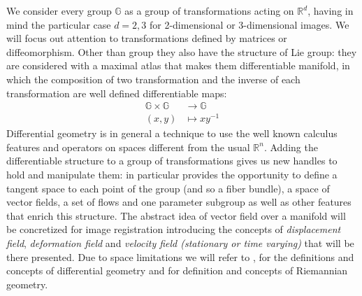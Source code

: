 We consider every group $\mathbb{G}$ as a group of transformations acting on $\mathbb{R}^{d}$, having in mind the particular case $d=2,3$ for 2-dimensional or 3-dimensional images.
We will focus out attention to transformations defined by matrices or diffeomorphism. Other than group they also have the structure of Lie group: they are considered with a maximal atlas that makes them differentiable manifold, in which the composition of two transformation and the inverse of each transformation are well defined differentiable maps:
\begin{align*}
\mathbb{G} \times \mathbb{G} & \longrightarrow  \mathbb{G}    \\
(x,y) &\longmapsto  x y^{-1}
\end{align*}
Differential geometry is in general a technique to use the well known calculus features and operators on spaces different from the usual $\mathbb{R}^{n}$. Adding the differentiable structure to a group of transformations gives us new handles to hold and manipulate them: in particular provides the opportunity to define a tangent space to each point of the group (and so a fiber bundle), a space of vector fields, a set of flows and one parameter subgroup as well as other features that enrich this structure. The abstract idea of vector field over a manifold will be concretized for image registration introducing the concepts of \emph{displacement field}, \emph{deformation field} and \emph{velocity field (stationary or time varying)} that will be there presented. 
Due to space limitations we will refer to \cite{do1976differential}, \cite{lee2012introduction} for the definitions and concepts of differential geometry and \cite{do1992riemannian} for definition and concepts of Riemannian geometry.

